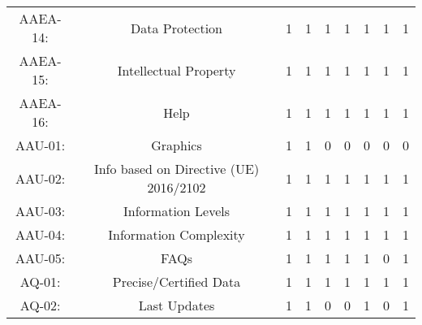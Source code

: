 \documentclass[a4paper, twoside]{report}
\begin{document}
\begin{table}[htbp]
\begin{adjustbox}{max width=\linewidth}
\begin{tabular}{rcccccccc}
    \multicolumn{1}{c}{AAEA-14:} & \multicolumn{1}{p{19em}}{Data Protection} & 1     & 1     & 1     & 1     & 1     & 1     & 1 \\
    \multicolumn{1}{c}{AAEA-15:} & \multicolumn{1}{p{19em}}{Intellectual Property} & 1     & 1     & 1     & 1     & 1     & 1     & 1 \\
    \multicolumn{1}{c}{AAEA-16:} & \multicolumn{1}{p{19em}}{Help} & 1     & 1     & 1     & 1     & 1     & 1     & 1 \\
    \midrule
    \multicolumn{1}{c}{AAU-01:} & \multicolumn{1}{p{19em}}{Graphics} & 1     & 1     & 0     & 0     & 0     & 0     & 0 \\
    \multicolumn{1}{c}{AAU-02:} & \multicolumn{1}{p{19em}}{Info based on Directive (UE) 2016/2102} & 1     & 1     & 1     & 1     & 1     & 1     & 1 \\
    \multicolumn{1}{c}{AAU-03:} & \multicolumn{1}{p{19em}}{\cellcolor[rgb]{ .749,  .749,  .749}Information Levels} & \cellcolor[rgb]{ .749,  .749,  .749}1 & \cellcolor[rgb]{ .749,  .749,  .749}1 & \cellcolor[rgb]{ .749,  .749,  .749}1 & \cellcolor[rgb]{ .749,  .749,  .749}1 & \cellcolor[rgb]{ .749,  .749,  .749}1 & \cellcolor[rgb]{ .749,  .749,  .749}1 & \cellcolor[rgb]{ .749,  .749,  .749}1 \\
    \multicolumn{1}{c}{AAU-04:} & \multicolumn{1}{p{19em}}{\cellcolor[rgb]{ .749,  .749,  .749}Information Complexity} & \cellcolor[rgb]{ .749,  .749,  .749}1 & \cellcolor[rgb]{ .749,  .749,  .749}1 & \cellcolor[rgb]{ .749,  .749,  .749}1 & \cellcolor[rgb]{ .749,  .749,  .749}1 & \cellcolor[rgb]{ .749,  .749,  .749}1 & \cellcolor[rgb]{ .749,  .749,  .749}1 & \cellcolor[rgb]{ .749,  .749,  .749}1 \\
    \multicolumn{1}{c}{AAU-05:} & \multicolumn{1}{p{19em}}{\cellcolor[rgb]{ .749,  .749,  .749}FAQs} & \cellcolor[rgb]{ .749,  .749,  .749}1 & \cellcolor[rgb]{ .749,  .749,  .749}1 & \cellcolor[rgb]{ .749,  .749,  .749}1 & \cellcolor[rgb]{ .749,  .749,  .749}1 & \cellcolor[rgb]{ .749,  .749,  .749}1 & \cellcolor[rgb]{ .749,  .749,  .749}0 & \cellcolor[rgb]{ .749,  .749,  .749}1 \\
    \midrule
    \multicolumn{1}{c}{AQ-01:} & \multicolumn{1}{p{19em}}{Precise/Certified Data} & 1     & 1     & 1     & 1     & 1     & 1     & 1 \\
    \multicolumn{1}{c}{AQ-02:} & \multicolumn{1}{p{19em}}{\cellcolor[rgb]{ .749,  .749,  .749}Last Updates} & \cellcolor[rgb]{ .749,  .749,  .749}1 & \cellcolor[rgb]{ .749,  .749,  .749}1 & \cellcolor[rgb]{ .749,  .749,  .749}0 & \cellcolor[rgb]{ .749,  .749,  .749}0 & \cellcolor[rgb]{ .749,  .749,  .749}1 & \cellcolor[rgb]{ .749,  .749,  .749}0 & \cellcolor[rgb]{ .749,  .749,  .749}1 \\

\end{tabular}
\end{adjustbox}
\end{table}
\end{document}
